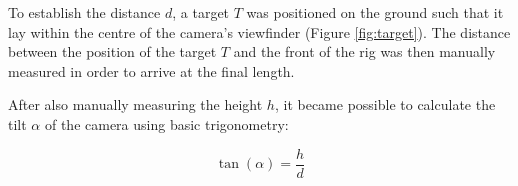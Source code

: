 To establish the distance $d$, a target $T$ was positioned on the ground such that it lay within the centre of the camera's viewfinder (Figure \ref{fig:target}). The distance between the position of the target $T$ and the front of the rig was then manually measured in order to arrive at the final length. 

After also manually measuring the height $h$, it became possible to calculate the tilt $ \alpha $ of the camera using basic trigonometry:

\begin{equation}
	\tan(\alpha) = \frac{h}{d}
\end{equation}

%
%
%
%
%
%
%
%
%
%

